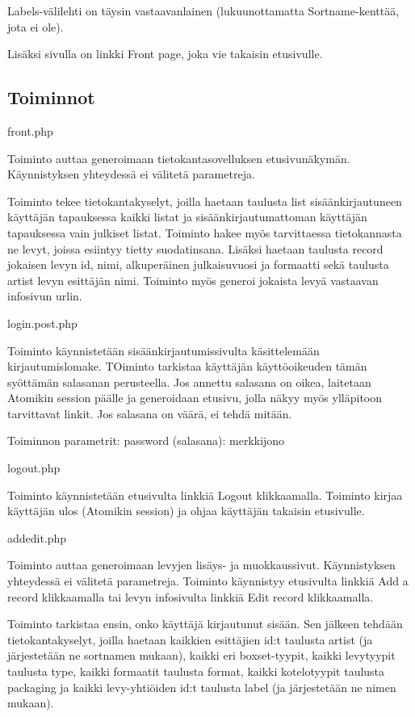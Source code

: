 \documentclass[a4paper,12pt]{report}
\begin{document}
Labels-välilehti on täysin vastaavanlainen (lukuunottamatta Sortname-kenttää, jota ei ole).

Lisäksi sivulla on linkki Front page, joka vie takaisin etusivulle.

\subsection{Toiminnot}

front.php

Toiminto auttaa generoimaan tietokantasovelluksen etusivunäkymän. Käynnistyksen yhteydessä ei välitetä parametreja.

Toiminto tekee tietokantakyselyt, joilla haetaan taulusta list sisäänkirjautuneen käyttäjän tapauksessa kaikki listat ja sisäänkirjautumattoman käyttäjän tapauksessa vain julkiset listat. 
Toiminto hakee myös tarvittaessa tietokannasta ne levyt, joissa esiintyy tietty suodatinsana.
Lisäksi haetaan taulusta record jokaisen levyn id, nimi, alkuperäinen julkaisuvuosi ja formaatti sekä taulusta artist levyn esittäjän nimi. Toiminto myös generoi jokaista levyä vastaavan infosivun urlin.


login.post.php

Toiminto käynnistetään sisäänkirjautumissivulta käsittelemään kirjautumislomake. TOiminto tarkistaa käyttäjän käyttöoikeuden tämän syöttämän salasanan perusteella. 
Jos annettu salasana on oikea, laitetaan Atomikin session päälle ja generoidaan etusivu, jolla näkyy myös ylläpitoon tarvittavat linkit. Jos salasana on väärä, ei tehdä mitään.

Toiminnon parametrit:
	password (salasana): merkkijono

	
logout.php

Toiminto käynnistetään etusivulta linkkiä Logout klikkaamalla. Toiminto kirjaa käyttäjän ulos (Atomikin session) ja ohjaa käyttäjän takaisin etusivulle.


addedit.php

Toiminto auttaa generoimaan levyjen lisäys- ja muokkaussivut. Käynnistyksen yhteydessä ei välitetä parametreja. 
Toiminto käynnistyy etusivulta linkkiä Add a record klikkaamalla tai levyn infosivulta linkkiä Edit record klikkaamalla.

Toiminto tarkistaa ensin, onko käyttäjä kirjautunut sisään. 
Sen jälkeen tehdään tietokantakyselyt, joilla haetaan kaikkien esittäjien id:t taulusta artist (ja järjestetään ne sortnamen mukaan), kaikki eri boxset-tyypit, 
kaikki levytyypit taulusta type, kaikki formaatit taulusta format, kaikki kotelotyypit taulusta packaging ja kaikki levy-yhtiöiden id:t taulusta label (ja järjestetään ne nimen mukaan).
\end{document}
